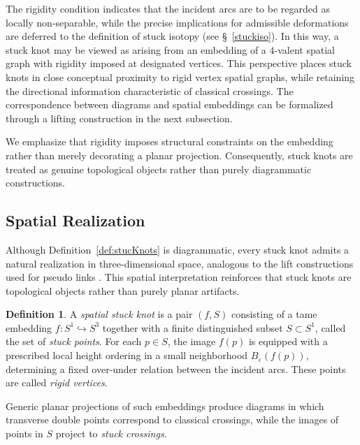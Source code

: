 \documentclass[11pt,a4paper]{article}
\theoremstyle{plain}
\theoremstyle{definition}
\newtheorem{definition}[theorem]{Definition}
\begin{document}
The rigidity condition indicates that the incident arcs are to be regarded as locally non-separable, while the precise implications for admissible deformations are deferred to the definition of stuck isotopy (see \S~\ref{stuckiso}). In this way, a stuck knot may be viewed as arising from an embedding of a $4$-valent spatial graph with rigidity imposed at designated vertices. This perspective places stuck knots in close conceptual proximity to rigid vertex spatial graphs, while retaining the directional information characteristic of classical crossings. The correspondence between diagrams and spatial embeddings can be formalized through a lifting construction in the next subsection.

We emphasize that rigidity imposes structural constraints on the embedding rather than merely decorating a planar projection. Consequently, stuck knots are treated as genuine topological objects rather than purely diagrammatic constructions.




\subsection{Spatial Realization}

Although Definition~\ref{def:stucKnots} is diagrammatic, every stuck knot admits a natural realization in three-dimensional space, analogous to the lift constructions used for pseudo links \cite{Diamantis2024}. This spatial interpretation reinforces that stuck knots are topological objects rather than purely planar artifacts.


\begin{definition}
A \emph{spatial stuck knot} is a pair $(f,S)$ consisting of a tame embedding $f:S^1 \hookrightarrow S^3$ together with a finite distinguished subset $S \subset S^1$, called the set of \emph{stuck points}. For each $p \in S$, the image $f(p)$ is equipped with a prescribed local height ordering in a small neighborhood $B_\varepsilon(f(p))$, determining a fixed over-under relation between the incident arcs. These points are called \emph{rigid vertices}.

Generic planar projections of such embeddings produce diagrams in which 
transverse double points correspond to classical crossings, while the 
images of points in $S$ project to \emph{stuck crossings}.
\end{definition}
\end{document}
